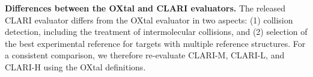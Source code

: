 \textbf{Differences between the OXtal and CLARI evaluators.}
The released CLARI evaluator differs from the OXtal evaluator in two aspects:
(1) collision detection, including the treatment of intermolecular collisions,
and (2) selection of the best experimental reference for targets with multiple
reference structures. For a consistent comparison, we therefore re-evaluate
CLARI-M, CLARI-L, and CLARI-H using the OXtal definitions.